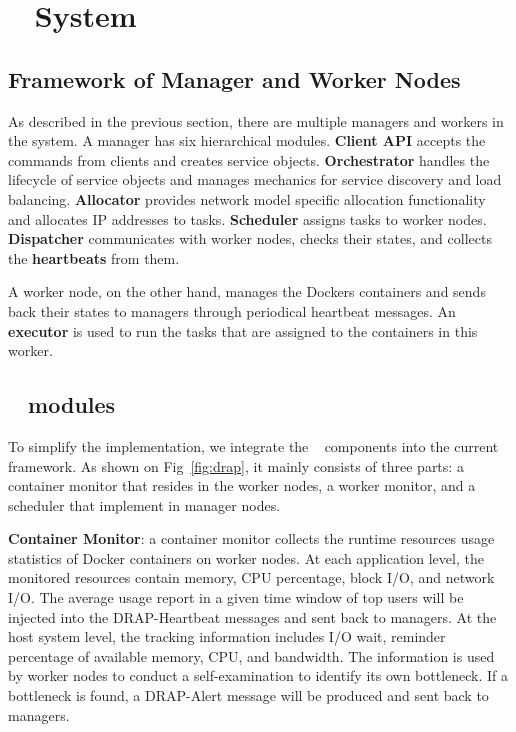 \section{\sol~ System}
\label{sys}
\subsection{Framework of Manager and Worker Nodes}
As described in the previous section, there are multiple managers and workers in the system.
A manager has six hierarchical modules.
{\bf Client API} accepts the commands from clients and creates service objects.
{\bf Orchestrator} handles the lifecycle of service objects and manages mechanics for service discovery and load balancing.
{\bf Allocator} provides network model specific allocation functionality and allocates IP addresses to tasks.
{\bf Scheduler} assigns tasks to worker nodes.
{\bf Dispatcher} communicates with worker nodes, checks their states, and collects the {\bf heartbeats} from them.

A worker node, on the other hand, manages the Dockers containers and sends back their states to managers through periodical heartbeat messages.
An {\bf executor} is used to run the tasks that are assigned to the containers in this worker.


\subsection{\sol~ modules}
To simplify the implementation, we integrate the \sol~ components into the current framework. As shown on Fig~\ref{fig:drap},
it mainly consists of three parts: a container monitor that resides in the worker nodes, a worker monitor, and a \sol~ scheduler that
implement in manager nodes.

{\bf Container Monitor}: a container monitor collects the runtime resources usage statistics of Docker containers on worker nodes. 
At each application level, the monitored resources contain memory, CPU percentage, block I/O, and network I/O. 
The average usage report in a given time window of top users will be injected into the DRAP-Heartbeat messages and sent back to managers.
At the host system level, the tracking information includes I/O wait, reminder percentage of available memory, CPU, and bandwidth. 
The information is used by worker nodes to conduct a self-examination to identify its own bottleneck. 
If a bottleneck is found, a DRAP-Alert message will be produced and sent back to managers.

